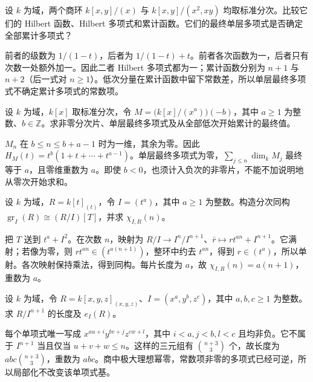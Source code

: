 \begin{exercise}\label{b3:ex:11-polynomial-forgets-low-degrees}
	设 \(k\) 为域，两个商环 \(k[x,y]/(x)\) 与 \(k[x,y]/(x^2,xy)\) 均取标准分次。比较它们的 Hilbert 函数、Hilbert 多项式和累计函数。它们的最终单层多项式是否确定全部累计多项式？
\end{exercise}
\begin{solution}
	前者的级数为 \(1/(1-t)\)，后者为 \(1/(1-t)+t\)。前者各次函数为一，后者只有次数一处额外加一。因此二者 Hilbert 多项式都为一；累计函数分别为 \(n+1\) 与 \(n+2\)（后一式对 \(n\ge1\)）。低次分量在累计函数中留下常数差，所以单层最终多项式不确定累计多项式的常数项。
\end{solution}

\begin{exercise}\label{b3:ex:11-zero-dimensional-shift}
	设 \(k\) 为域，\(k[x]\) 取标准分次，令 \(M=\bigl(k[x]/(x^a)\bigr)(-b)\)，其中 \(a\ge1\) 为整数、\(b\in\mathbb Z\)。求非零分次片、单层最终多项式及从全部低次开始累计的最终值。
\end{exercise}
\begin{solution}
	\(M_n\) 在 \(b\le n\le b+a-1\) 时为一维，其余为零。因此 \(H_M(t)=t^b(1+t+\cdots+t^{a-1})\)。单层最终多项式为零，\(\sum_{j\le n}\dim_kM_j\) 最终等于 \(a\)，且零维重数为 \(a\)。即使 \(b<0\)，也须计入负次的非零片，不能不加说明地从零次开始求和。
\end{solution}

\begin{exercise}\label{b3:ex:11-dvr-adic}
	设 \(k\) 为域，\(R=k[t]_{(t)}\)，令 \(I=(t^a)\)，其中 \(a\ge1\) 为整数。构造分次同构 \(\operatorname{gr}_I(R)\cong(R/I)[T]\)，并求 \(\chi_{I,R}(n)\)。
\end{exercise}
\begin{solution}
	把 \(T\) 送到 \(t^a+I^2\)。在次数 \(n\)，映射为 \(R/I\to I^n/I^{n+1}\)、\(\bar r\mapsto rt^{an}+I^{n+1}\)。它满射；若像为零，则 \(rt^{an}\in\left(t^{a(n+1)}\right)\)，整环中约去 \(t^{an}\)，得到 \(r\in(t^a)\)，所以单射。各次映射保持乘法，得到同构。每片长度为 \(a\)，故 \(\chi_{I,R}(n)=a(n+1)\)，重数为 \(a\)。
\end{solution}

\begin{exercise}\label{b3:ex:11-three-parameters}
	设 \(k\) 为域，令 \(R=k[x,y,z]_{(x,y,z)}\)、\(I=(x^a,y^b,z^c)\)，其中 \(a,b,c\ge1\) 为整数。求 \(R/I^{n+1}\) 的长度及 \(e_I(R)\)。
\end{exercise}
\begin{solution}
	每个单项式唯一写成 \(x^{au+i}y^{bv+j}z^{cw+l}\)，其中 \(i<a,j<b,l<c\) 且均非负。它不属于 \(I^{n+1}\) 当且仅当 \(u+v+w\le n\)。这样的三元组有 \(\binom{n+3}{3}\) 个，故长度为 \(abc\binom{n+3}{3}\)，重数为 \(abc\)。商中极大理想幂零，常数项非零的多项式已经可逆，所以局部化不改变该单项式基。
\end{solution}

